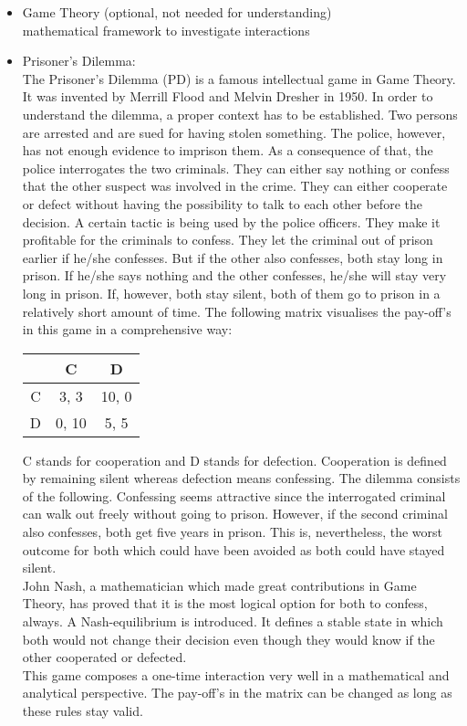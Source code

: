 \documentclass{article}
\begin{document}
\begin{itemize}

	\item Game Theory (optional, not needed for understanding)\\
		mathematical framework to investigate interactions\\

	\item Prisoner's Dilemma:\\
		
The Prisoner's Dilemma (PD) is a famous intellectual game in Game Theory. 
It was invented by Merrill Flood and Melvin Dresher in 1950. 
In order to understand the dilemma, a proper context has to be established. 
Two persons are arrested and are sued for having stolen something. 
The police, however, has not enough evidence to imprison them. 
As a consequence of that, the police interrogates the two criminals. 
They can either say nothing or confess that the other suspect was involved in the crime. 
They can either cooperate or defect without having the possibility to talk to each other before the decision. 
A certain tactic is being used by the police officers. 
They make it profitable for the criminals to confess. 
They let the criminal out of prison earlier if he/she confesses. 
But if the other also confesses, both stay long in prison. 
If he/she says nothing and the other confesses, he/she will stay very long in prison. 
If, however, both stay silent, both of them go to prison in a relatively short amount of time. 
The following matrix visualises the pay-off's in this game in a comprehensive way:

\begin{center}
\begin{tabular}{ c|c|c }
   & C & D \\ 
   \hline
 C & 3, 3 & 10, 0\\  
   \hline
 D & 0, 10 & 5, 5
\end{tabular}
\end{center}

C stands for cooperation and D stands for defection. 
Cooperation is defined by remaining silent whereas defection means confessing. 
The dilemma consists of the following. 
Confessing seems attractive since the interrogated criminal can walk out freely without going to prison. 
However, if the second criminal also confesses, both get five years in prison. 
This is, nevertheless, the worst outcome for both which could have been avoided as both could have stayed silent.\\
John Nash, a mathematician which made great contributions in Game Theory, has proved that it is the most logical option for both to confess, always. 
A Nash-equilibrium is introduced. 
It defines a stable state in which both would not change their decision even though they would know if the other cooperated or defected.\\
This game composes a one-time interaction very well in a mathematical and analytical perspective. 
The pay-off's in the matrix can be changed as long as these rules stay valid.



\end{itemize}
\end{document}
